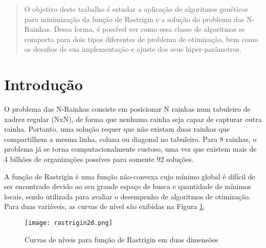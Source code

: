 \documentclass[conference]{IEEEtran}
\begin{document}
\maketitle

\begin{abstract}
O objetivo deste trabalho é estudar a aplicação de algoritmos genéticos para minimização da função de Rastrigin e a solução do problema das N-Rainhas. Dessa forma, é possível ver como essa classe de algoritmos se comporta para dois tipos diferentes de problema de otimização, bem como os desafios de sua implementação e ajuste dos seus hiper-parâmetros.

\end{abstract}





%



\section{Introdução}

O problema das N-Rainhas \cite{bell2009survey} consiste em posicionar N rainhas num tabuleiro de xadrez regular (NxN), de forma que nenhuma rainha seja capaz de capturar outra rainha. Portanto, uma solução requer que não existam duas rainhas que compartilhem a mesma linha, coluna ou diagonal no tabuleiro. Para 8 rainhas, o problema já se torna computacionalmente custoso, uma vez que existem mais de 4 bilhões de organizações possíves para somente 92 soluções. 

A função de Rastrigin \cite{hoffmeister1991} é uma função não-convexa cujo mínimo global é difícil de ser encontrado devido ao seu grande espaço de busca e quantidade de mínimos locais, sendo utilizada para avaliar o desempenho de algoritmos de otimização. Para duas variáveis, as curvas de nível são exibidas na Figura \ref{fig:rastrigin2d}.

\begin{figure}[h!]
	\centering
	\texttt{[image: rastrigin2d.png]}
	\caption{Curvas de níveis para função de Rastrigin em duas dimensões}
	\label{fig:rastrigin2d}
\end{figure}
\end{document}
